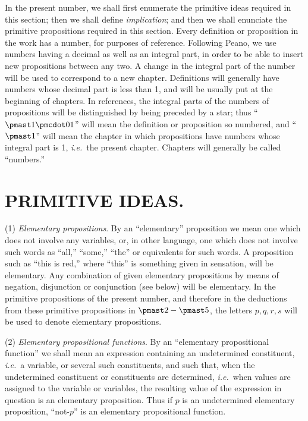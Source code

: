 \documentclass[letterpaper,12pt,openany,leqno]{book}
\newcommand{\pagefirst}[1]{\marginnote[\boxed{\text{#1}}]{\boxed{\text{#1}}}}
\begin{document}
In the present number, we shall first enumerate the primitive ideas required in this section; then we shall define \textit{implication}; and then we shall enunciate the primitive propositions required in this section. Every definition or proposition in the work has a number, for purposes of reference. Following Peano, we use numbers having a decimal as well as an integral part, in order to be able to insert new propositions between any two. A change in the integral part of the number will be used to correspond to a new chapter. Definitions will generally have numbers whose decimal part is less than 1, and will be usually put at the beginning of chapters. In references, the integral parts of the numbers of propositions will be distinguished by being preceded by a star; thus ``$\pmast1\pmcdot01$'' will mean the definition or proposition so numbered, and ``$\pmast1$'' will mean the chapter in which propositions have numbers whose integral part is 1, \textit{i.e.}\ the present chapter. Chapters will generally be called ``numbers.''

\section*{\centering PRIMITIVE IDEAS.}

(1) \textit{Elementary propositions}. By an ``elementary'' proposition we mean one which does not involve any variables, or, in other language, one which does not involve such words as ``all,'' ``some,'' ``the'' or equivalents for such words. A proposition such as ``this is red,'' where ``this'' is something given \pagefirst{96} in sensation, will be elementary. Any combination of given elementary propositions by means of negation, disjunction or conjunction (see below) will be elementary. In the primitive propositions of the present number, and therefore in the deductions from these primitive propositions in $\pmast2-\pmast5$, the letters $p, q, r, s$ will be used to denote elementary propositions.

(2) \textit{Elementary propositional functions}. By an ``elementary propositional function'' we shall mean an expression containing an undetermined constituent, \textit{i.e.}\ a variable, or several such constituents, and such that, when the undetermined constituent or constituents are determined, \textit{i.e.}\ when values are assigned to the variable or variables, the resulting value of the expression in question is an elementary proposition. Thus if $p$ is an undetermined elementary proposition, ``not-$p$'' is an elementary propositional function.
\end{document}
